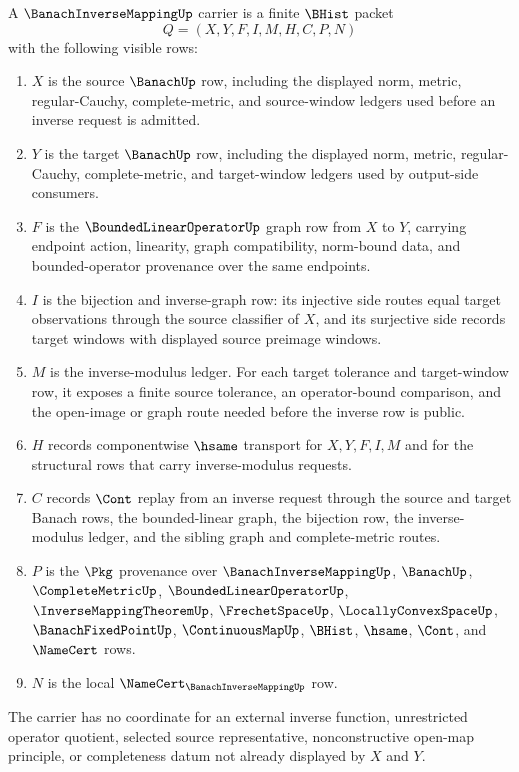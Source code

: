 \begin{definition}
\label{def:banach-inverse-mapping-carrier}
A $\BanachInverseMappingUp$ carrier is a finite $\BHist$ packet
$$
Q=(X,Y,F,I,M,H,C,P,N)
$$
with the following visible rows:
\begin{enumerate}
\item $X$ is the source $\BanachUp$ row, including the displayed norm, metric, regular-Cauchy, complete-metric, and source-window ledgers used before an inverse request is admitted.
\item $Y$ is the target $\BanachUp$ row, including the displayed norm, metric, regular-Cauchy, complete-metric, and target-window ledgers used by output-side consumers.
\item $F$ is the $\BoundedLinearOperatorUp$ graph row from $X$ to $Y$, carrying endpoint action, linearity, graph compatibility, norm-bound data, and bounded-operator provenance over the same endpoints.
\item $I$ is the bijection and inverse-graph row: its injective side routes equal target observations through the source classifier of $X$, and its surjective side records target windows with displayed source preimage windows.
\item $M$ is the inverse-modulus ledger. For each target tolerance and target-window row, it exposes a finite source tolerance, an operator-bound comparison, and the open-image or graph route needed before the inverse row is public.
\item $H$ records componentwise $\hsame$ transport for $X,Y,F,I,M$ and for the structural rows that carry inverse-modulus requests.
\item $C$ records $\Cont$ replay from an inverse request through the source and target Banach rows, the bounded-linear graph, the bijection row, the inverse-modulus ledger, and the sibling graph and complete-metric routes.
\item $P$ is the $\Pkg$ provenance over $\BanachInverseMappingUp$, $\BanachUp$, $\CompleteMetricUp$, $\BoundedLinearOperatorUp$, $\InverseMappingTheoremUp$, $\FrechetSpaceUp$, $\LocallyConvexSpaceUp$, $\BanachFixedPointUp$, $\ContinuousMapUp$, $\BHist$, $\hsame$, $\Cont$, and $\NameCert$ rows.
\item $N$ is the local $\NameCert_{\BanachInverseMappingUp}$ row.
\end{enumerate}
The carrier has no coordinate for an external inverse function, unrestricted operator quotient, selected source representative, nonconstructive open-map principle, or completeness datum not already displayed by $X$ and $Y$.
\end{definition}

